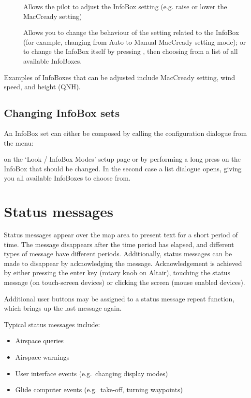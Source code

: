 \begin{description}
\item[]  
  Allows the pilot to adjust the InfoBox setting (e.g. raise or lower the MacCready setting)

\item[]
  Allows you to change the behaviour of the setting related to the InfoBox (for example, changing from Auto to Manual MacCready setting mode); or to change the InfoBox itself by pressing , then choosing from a list of all available InfoBoxes.

\end{description}


Examples of InfoBoxes that can
be adjusted include MacCready setting, wind speed, and height (QNH).

\subsection*{Changing InfoBox sets}
An InfoBox set can either be composed by calling the configuration dialogue from the menu: \begin{center}
\blink{}
\end{center}
on the `Look / InfoBox Modes' setup page or by
performing a long press on the InfoBox that should be changed. In the second case a list dialogue opens, giving you all available InfoBoxes to choose from.

\section{Status messages}
Status messages appear over the map area to present text for a short period of
time.  The message disappears after the time period has elapsed, and different
types of message have different periods. Additionally, status messages can be
made to disappear by acknowledging the message.  Acknowledgement is achieved by
either pressing the enter key (rotary knob on Altair), touching the status
message (on touch-screen devices) or clicking the screen (mouse enabled devices).

Additional user buttons may be assigned to a status message repeat function,
which brings up the last message again.

Typical status messages include:
\begin{itemize}
\item Airspace queries
\item Airspace warnings
\item User interface events (e.g.\ changing display modes)
\item Glide computer events (e.g.\ take-off, turning waypoints)
\end{itemize}

